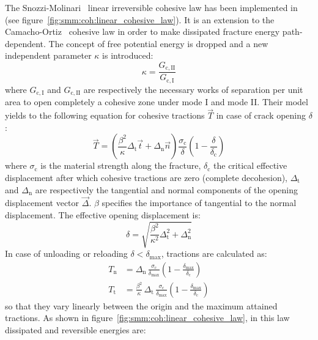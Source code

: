 The Snozzi-Molinari~\cite{snozzi_cohesive_2013} linear irreversible
cohesive law has been implemented in \akantu (see
figure~\ref{fig:smm:coh:linear_cohesive_law}). It is an extension to
the Camacho-Ortiz~\cite{camacho_computational_1996} cohesive law in
order to make dissipated fracture energy path-dependent. The concept
of free potential energy is dropped and a new independent parameter
$\kappa$ is introduced:
\begin{equation}
  \kappa = \frac{G_\mathrm{c, II}}{G_\mathrm{c, I}}
\end{equation}
where $G_\mathrm{c, I}$ and $G_\mathrm{c, II}$ are respectively the
necessary works of separation per unit area to open completely a
cohesive zone under mode I and mode II. Their model yields to the
following equation for cohesive tractions $\vec{T}$ in case of crack opening ${\delta}$:
\begin{equation}
  \label{eq:smm:coh:tractions}
  \vec{T} = \left( \frac{\beta^2}{\kappa} \Delta_\mathrm{t} \vec{t} +
    \Delta_\mathrm{n} \vec{n} \right)
  \frac{\sigma_\mathrm{c}}{\delta}
  \left( 1- \frac{\delta}{\delta_\mathrm{c}} \right)
\end{equation}
where $\sigma_\mathrm{c}$ is the material strength along the fracture,
$\delta_\mathrm{c}$ the critical effective displacement after which
cohesive tractions are zero (complete decohesion), $\Delta_\mathrm{t}$
and $\Delta_\mathrm{n}$ are respectively the tangential and normal
components of the opening displacement vector $\vec{\Delta}$. $\beta$ specifies the importance of tangential to the normal displacement. The
effective opening displacement is: 
\begin{equation}
  \delta = \sqrt{\frac{\beta^2}{\kappa^2} \Delta_\mathrm{t}^2 +
    \Delta_\mathrm{n}^2}
\end{equation}
In case of unloading or reloading $\delta < \delta_\mathrm{max}$,
tractions are calculated as:
\begin{align}
  T_\mathrm{n} &= \Delta_\mathrm{n}\,
  \frac{\sigma_\mathrm{c}}{\delta_\mathrm{max}}
  \left( 1- \frac{\delta_\mathrm{max}}{\delta_\mathrm{c}} \right) \\
  T_\mathrm{t} &= \frac{\beta^2}{\kappa}\, \Delta_\mathrm{t}\,
  \frac{\sigma_\mathrm{c}}{\delta_\mathrm{max}}
  \left( 1- \frac{\delta_\mathrm{max}}{\delta_\mathrm{c}} \right)
\end{align}
so that they vary linearly between the origin and the maximum attained
tractions. As shown in figure~\ref{fig:smm:coh:linear_cohesive_law}, in this law dissipated and reversible energies are:
